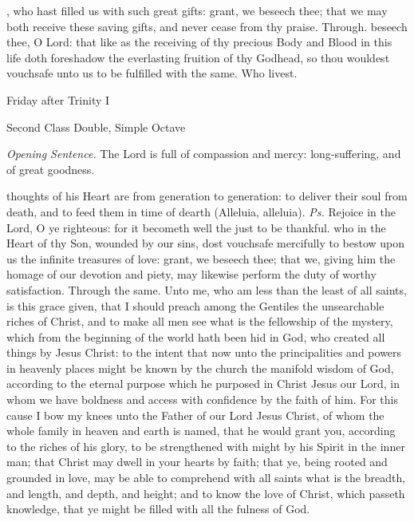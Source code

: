 
\postcommunion
{}, who hast filled us with such great gifts: grant, we beseech thee; that we may both receive these saving gifts, and never cease from thy praise. Through.
 beseech thee, O Lord: that like as the receiving of thy precious Body and Blood in this life doth foreshadow the everlasting fruition of thy Godhead, so thou wouldest vouchsafe unto us to be fulfilled with the same. Who livest.


\begin{inhead}
	{Friday after Trinity I}\par
    {Second Class Double, Simple Octave}
\end{inhead}
\par\noindent
\textit{Opening Sentence.} The Lord is full of compassion and mercy: long-suffering, and of great goodness.

\introit
{} thoughts of his Heart are from generation to generation: to deliver their soul from death, and to feed them in time of dearth (Alleluia, alleluia). \textit{Ps.} Rejoice in the Lord, O ye righteous: for it becometh well the just to be thankful.
\collect
{} who in the Heart of thy Son, wounded by our sins, dost vouchsafe mercifully to bestow upon us the infinite treasures of love: grant, we beseech thee; that we, giving him the homage of our devotion and piety, may likewise perform the duty of worthy satisfaction. Through the same.
 Unto me, who am less than the least of all saints, is this grace given, that I should preach among the Gentiles the unsearchable riches of Christ, and to make all men see what is the fellowship of the mystery, which from the beginning of the world hath been hid in God, who created all things by Jesus Christ: to the intent that now unto the principalities and powers in heavenly places might be known by the church the manifold wisdom of God, according to the eternal purpose which he purposed in Christ Jesus our Lord, in whom we have boldness and access with confidence by the faith of him. For this cause I bow my knees unto the Father of our Lord Jesus Christ, of whom the whole family in heaven and earth is named, that he would grant you, according to the riches of his glory, to be strengthened with might by his Spirit in the inner man; that Christ may dwell in your hearts by faith; that ye, being rooted and grounded in love, may be able to comprehend with all saints what is the breadth, and length, and depth, and height; and to know the love of Christ, which passeth knowledge, that ye might be filled with all the fulness of God.

